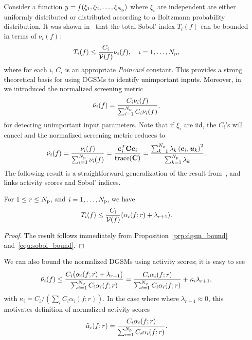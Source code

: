 Consider a function $y = f(\xi_1, \xi_2, \ldots, \xi_{N_\text{p}})$ where
$\xi_i$ are independent are either uniformly distributed or
distributed according to a Boltzmann probability distribution.  
It was shown in~\cite{Lamboni:2013} that the total Sobol' 
index $T_i(f)$ can be bounded in terms of $\nu_i(f)$:
\begin{equation}\label{equ:sobol_bound}
T_i(f) \leq \frac{C_i}{\mathcal{V}(f)}\nu_i(f), \quad i = 1, \ldots, {N_\text{p}},
\end{equation}
where for each $i$, $C_i$ is an appropriate \emph{Poincar\'{e}} constant.
This provides a strong theoretical basis for using DGSMs to identify 
unimportant inputs. Moreover, 
in~\cite{Vohra:2018} we introduced the normalized screening metric
\[
   \tilde{\nu}_i(f) = \frac{C_i \nu_i(f)}{\sum_{i=1}^{N_\text{p}} C_i \nu_i(f)},
\]
for detecting unimportant input parameters. 
Note that if $\xi_i$ are iid, the $C_i$'s will cancel and the normalized screening
metric reduces to 
\[
    \tilde{\nu}_i(f) = \frac{\nu_i(f)}{\sum_{i=1}^\Np \nu_i(f)} 
      = \frac{\vec{e}_i^T \mat{C} \vec{e}_i}{\trace(\mat{C})} 
      = \frac{\sum_{k=1}^\Np \lambda_k \ip{\vec{e}_i}{\vec{u}_k}^2}{\sum_{k = 1}^\Np \lambda_k}.
\]
The following result is a straightforward generalization of
the result from~\cite{Diaz:2016}, and 
links activity scores and Sobol' indices.
\begin{proposition}
For $1 \leq r \leq {N_\text{p}}$, and $i = 1, \ldots, {N_\text{p}}$, we have
\[
       T_i(f) \leq \frac{C_i}{\mathcal{V}(f)}(\alpha_i(f; r) + \lambda_{r+1}).
\]
\end{proposition}
\begin{proof}
The result follows immediately from Proposition~\ref{prp:dgsm_bound} and~\eqref{equ:sobol_bound}.
\end{proof}
We can also bound the normalized DGSMs using activity scores; it is easy to see  
\[
\tilde{\nu}_i(f) \leq 
\frac{ C_i \big(\alpha_i(f; r) + \lambda_{r+1}\big)}{\sum_{i=1}^{N_\text{p}} C_i \alpha_i(f; r)}
=\frac{C_i \alpha_i(f; r)}{\sum_{i=1}^{N_\text{p}} C_i \alpha_i(f; r)} + \kappa_i \lambda_{r+1}, 
\]
with $\kappa_i = C_i / (\sum_i C_i \alpha_i(f; r))$. 
In the case where where $\lambda_{r+1} \approx 0$, 
this motivates definition of
normalized activity scores
\[
   \tilde{\alpha}_i(f; r) =  \frac{C_i \alpha_i(f; r)}{\sum_{i=1}^{N_\text{p}} C_i \alpha_i(f; r)}.
\] 

